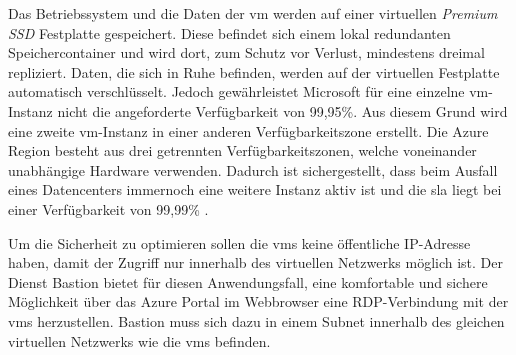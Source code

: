 Das Betriebssystem und die Daten der \ac{vm} werden auf einer virtuellen \textit{Premium SSD} Festplatte gespeichert. Diese befindet sich einem lokal redundanten Speichercontainer und wird dort, zum Schutz vor Verlust, mindestens dreimal repliziert. Daten, die sich in Ruhe befinden, werden auf der virtuellen Festplatte automatisch verschlüsselt. Jedoch gewährleistet Microsoft für eine einzelne \ac{vm}-Instanz nicht die angeforderte Verfügbarkeit von 99,95\%. Aus diesem Grund wird eine zweite \ac{vm}-Instanz in einer anderen Verfügbarkeitszone erstellt. Die Azure Region besteht aus drei getrennten Verfügbarkeitszonen, welche voneinander unabhängige Hardware verwenden. Dadurch ist sichergestellt, dass beim Ausfall eines Datencenters immernoch eine weitere Instanz aktiv ist und die \ac{sla} liegt bei einer Verfügbarkeit von 99,99\% \cite[vgl.][]{soh_data_2020}.

Um die Sicherheit zu optimieren sollen die \acp{vm} keine öffentliche IP-Adresse haben, damit der Zugriff nur innerhalb des virtuellen Netzwerks möglich ist. Der Dienst Bastion bietet für diesen Anwendungsfall, eine komfortable und sichere Möglichkeit über das Azure Portal im Webbrowser eine RDP-Verbindung mit der \acp{vm} herzustellen. Bastion muss sich dazu in einem Subnet innerhalb des gleichen virtuellen Netzwerks wie die \acp{vm} befinden.